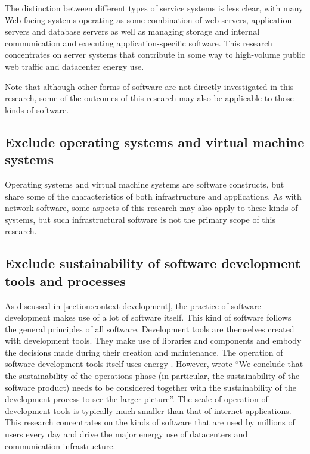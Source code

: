 The distinction between different types of service systems is less clear, with many Web-facing systems operating as some combination of web servers, application servers and database servers as well as managing storage and internal communication and executing application-specific software. This research concentrates on server systems that contribute in some way to high-volume public web traffic and datacenter energy use.

Note that although other forms of software are not directly investigated in this research, some of the outcomes of this research may also be applicable to those kinds of software.

\subsection{Exclude operating systems and virtual machine systems}
\label{exclude:operating systems}

Operating systems and virtual machine systems are software constructs, but share some of the characteristics of both infrastructure and applications. As with network software, some aspects of this research may also apply to these kinds of systems, but such infrastructural software is not the primary scope of this research.

\subsection{Exclude sustainability of software development tools and processes}
\label{exclude:development}

As discussed in \autoref{section:context development}, the practice of software development makes use of a lot of software itself. This kind of software follows the general principles of all software. Development tools are themselves created with development tools. They make use of libraries and components and embody the decisions made during their creation and maintenance. The operation of software development tools itself uses energy \citep{Zaidman2024}. However, \citet{Wahler2024} wrote \enquote{We conclude that the sustainability of the operations phase (in particular, the sustainability of the software product) needs to be considered together with the sustainability of the development process to see the larger picture}. The scale of operation of development tools is typically much smaller than that of internet applications. This research concentrates on the kinds of software that are used by millions of users every day and drive the major energy use of datacenters and communication infrastructure.

